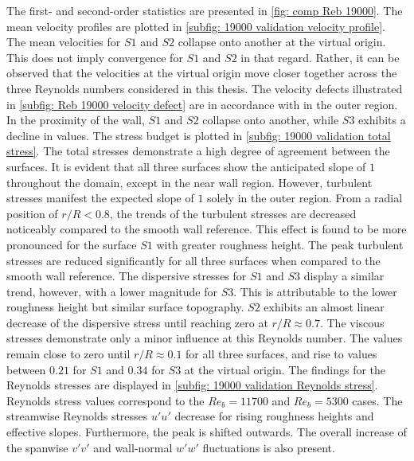 The first- and second-order statistics are presented in \autoref{fig: comp Reb 19000}.
The mean velocity profiles are plotted in \autoref{subfig: 19000 validation velocity profile}.
The mean velocities for $S1$ and $S2$ collapse onto another at the virtual origin. This does not imply convergence for $S1$ and $S2$ in that regard.
Rather, it can be observed that the velocities at the virtual origin move closer together across the three Reynolds numbers considered in this thesis.
The velocity defects illustrated in \autoref{subfig: Reb 19000 velocity defect} are in accordance with in the outer region.
In the proximity of  the wall, $S1$ and $S2$ collapse onto another, while $S3$ exhibits  a decline in values.
The stress budget is plotted in \autoref{subfig: 19000 validation total stress}.
The total stresses demonstrate a high degree of agreement  between the surfaces.
It is evident that all  three surfaces show the anticipated slope of $1$ throughout the domain, except in the near wall region.
However, turbulent stresses manifest the expected slope of $1$ solely in the outer region.
From a radial position of $r/R < 0.8$, the trends of the turbulent stresses are decreased noticeably compared to the smooth wall reference.
This effect is found to be more pronounced  for  the surface $S1$  with  greater roughness height.
The peak turbulent stresses are reduced significantly for all three surfaces when compared to the smooth wall reference.
The dispersive stresses for $S1$ and $S3$ display  a similar trend, however, with a lower magnitude for $S3$.  This is attributable  to the lower roughness height but similar surface topography.
$S2$ exhibits an almost linear decrease of the dispersive stress until reaching zero at $r/R \approx 0.7$.
The viscous stresses demonstrate only a minor  influence at this Reynolds number.
The values remain close to  zero until $r/R \approx 0.1$ for all three surfaces, and rise to values between $0.21$ for $S1$ and $0.34$ for $S3$ at the virtual origin.
The findings for the Reynolds stresses are displayed in \autoref{subfig: 19000 validation Reynolds stress}. Reynolds stress values correspond to the $Re_b = 11700$ and $Re_b = 5300$ cases.
The streamwise Reynolds stresses $u'u'$ decrease for rising roughness heights and effective slopes. 
Furthermore, the peak is shifted outwards.
The overall increase of the spanwise $v'v'$ and wall-normal $w'w'$ fluctuations is also present.


